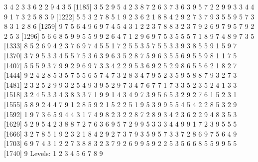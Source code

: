\documentclass[
]{article}
\newenvironment{Shaded}{\begin{snugshade}}{\end{snugshade}}
\newcommand{\FunctionTok}[1]{\textcolor[rgb]{0.00,0.00,0.00}{#1}}
\newcommand{\NormalTok}[1]{#1}
\newcommand{\SpecialCharTok}[1]{\textcolor[rgb]{0.00,0.00,0.00}{#1}}
\begin{document}
3 4 2 3 3 6 2 2 9 4 3 5 {[}1185{]} 3 5 2 9 5 4 2 3 8 7 2 6 3 7 3 6 3 9 5
7 2 2 9 9 3 3 4 4 9 1 7 3 2 5 8 3 9 {[}1222{]} 5 5 3 2 7 8 5 1 9 2 3 6 2
1 8 8 4 2 9 2 7 3 7 9 3 5 5 9 5 7 3 8 3 1 2 8 6 {[}1259{]} 9 7 5 6 4 9 6
9 7 4 5 4 3 1 2 2 3 7 8 8 3 2 3 7 9 2 6 9 7 9 5 7 9 2 2 5 3 {[}1296{]} 5
6 6 8 5 9 9 5 5 9 9 2 6 4 7 1 2 9 6 9 7 5 3 5 5 5 7 1 8 9 7 4 8 9 7 3 5
{[}1333{]} 8 5 2 6 9 4 2 3 7 6 9 7 4 5 5 1 7 2 5 5 3 5 7 5 5 3 3 9 3 8 5
5 9 1 5 9 7 {[}1370{]} 3 7 9 5 3 3 4 5 5 7 5 3 6 3 9 6 3 5 2 8 7 5 9 6 3
5 5 6 9 5 5 9 8 1 1 7 5 {[}1407{]} 5 5 5 9 3 7 9 9 2 9 6 9 7 3 3 4 2 2 9
5 3 6 9 2 5 2 9 8 6 5 5 6 2 1 8 2 7 {[}1444{]} 9 2 4 2 8 5 3 5 7 5 5 6 5
7 4 7 3 2 8 3 4 7 9 5 2 3 5 9 5 8 8 7 9 3 2 7 3 {[}1481{]} 2 3 2 5 2 9 9
3 2 5 4 9 3 9 5 2 9 7 3 4 7 6 7 7 1 7 3 3 5 2 3 5 2 4 1 3 3 {[}1518{]} 3
2 4 5 3 3 4 3 8 3 3 7 1 9 9 1 4 3 4 9 7 3 9 5 6 5 3 2 9 2 7 6 1 5 2 3 1
{[}1555{]} 5 8 9 2 4 4 7 9 1 2 8 5 9 2 1 5 2 2 5 1 9 5 3 9 9 5 5 4 5 4 2
2 8 5 3 2 9 {[}1592{]} 1 9 7 3 6 5 9 4 4 3 1 7 4 9 8 2 3 2 2 8 7 2 8 9 3
4 2 3 6 2 2 9 4 8 3 5 3 {[}1629{]} 5 2 9 5 4 2 3 8 8 7 2 7 6 3 6 9 5 7 2
9 9 5 3 3 3 4 4 9 9 1 7 2 3 9 5 5 5 {[}1666{]} 3 2 7 8 5 1 9 2 3 2 1 8 4
2 9 2 7 3 7 9 3 5 9 5 7 3 3 7 2 8 6 9 7 5 6 4 9 {[}1703{]} 6 9 7 4 3 1 2
2 7 3 8 8 3 2 3 7 9 2 6 9 9 5 9 2 2 5 3 5 6 6 8 5 5 9 9 5 5 {[}1740{]} 9
Levels: 1 2 3 4 5 6 7 8 9

\begin{Shaded}
\end{Shaded}
\end{document}
